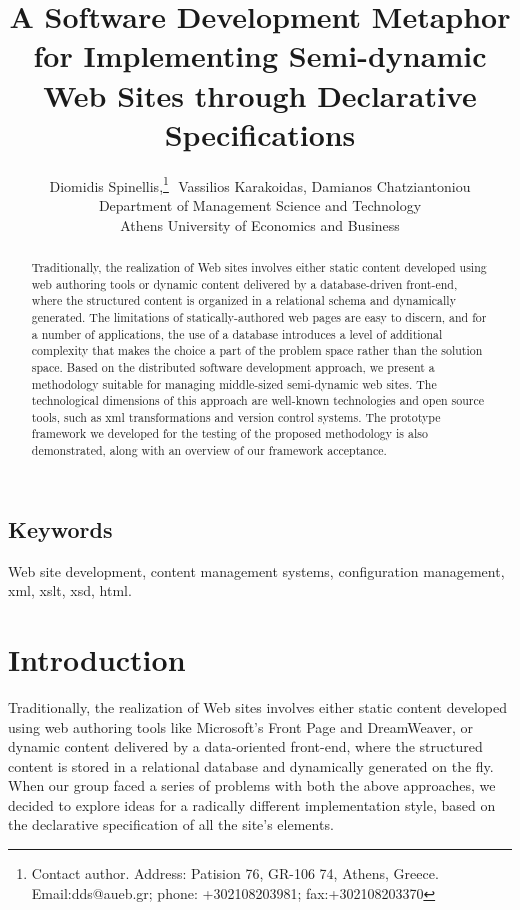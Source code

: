 \documentclass{article}
\begin{document}
\title{A Software Development Metaphor for Implementing Semi-dynamic Web Sites through Declarative Specifications}

\author{Diomidis Spinellis,\footnote{
Contact author.  Address:
Patision 76, GR-106 74, Athens, Greece.
Email:dds@aueb.gr; phone: +302108203981; fax:+302108203370}
\,\,Vassilios Karakoidas, Damianos Chatziantoniou\\
Department of Management Science and Technology\\
Athens University of Economics and Business}

\date{}


\maketitle

\begin{abstract}
Traditionally, the realization of Web sites involves either
static content developed using web authoring tools or dynamic
content delivered by a database-driven front-end,
where the structured content is organized
in a relational schema and dynamically generated.
The limitations of statically-authored web pages are easy to discern, and
for a number of applications, the use of a database
introduces a level of additional complexity that
makes the choice a part of the problem space rather than the solution space.
Based on the distributed software development approach, we present a methodology suitable for managing 
middle-sized semi-dynamic web sites. The technological dimensions of this
approach are well-known technologies and open source tools,
such as {\sc xml} transformations and
version control systems.
The prototype framework we developed for the testing of the proposed methodology
is also demonstrated, along with an overview of our framework acceptance.
\end{abstract}

\subsection*{Keywords}
Web site development,
content management systems,
configuration management,
{\sc xml},
{\sc xslt},
{\sc xsd},
{\sc html}.

\newpage

\section{Introduction}
\label{sec:intro}
Traditionally, the realization of Web sites involves either
static content developed using web authoring tools like
Microsoft's Front Page and DreamWeaver, or dynamic
content delivered by a data-oriented front-end,
where the structured content is stored in a relational database 
and dynamically generated on the fly.
When our group faced a series of problems with both the above approaches,
we decided to explore ideas for a radically different
implementation style, based on the declarative specification
of all the site's elements.
\end{document}
